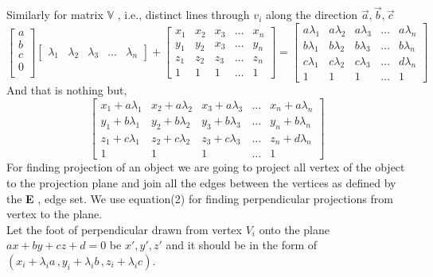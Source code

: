 	Similarly for matrix $ \mathbb{V} $ , i.e., distinct lines through $v_i$ along the direction $ \vec{a}, \vec{b}, \vec{c}$ \:
    $$ 
    \begin{bmatrix}
    a \\
    b \\
    c \\
    0 \\
    \end{bmatrix}
    \begin{bmatrix}
    \lambda_{1} & \lambda_{2} & \lambda_{3} & \dots  &\lambda_{n}
    \end{bmatrix}
    + 
    \begin{bmatrix}
    x_{1}       & x_{2} & x_{3} & \dots & x_{n} \\
    y_{1}       & y_{2} & x_{3} & \dots & y_{n} \\
    z_{1}       & z_{2} & z_{3} & \dots & z_{n} \\
    1 & 1 & 1& \dots & 1 
\end{bmatrix}
 = 
 \begin{bmatrix}
 a\lambda_{1} & a\lambda_{2} & a\lambda_{3} & \dots & a\lambda_{n} \\
 b\lambda_{1} & b\lambda_{2} & b\lambda_{3} & \dots &b\lambda_{n} \\
 c\lambda_{1} & c\lambda_{2} & c\lambda_{3} & \dots & d\lambda_{n} \\
1 & 1 & 1& \dots & 1 
 \end{bmatrix}
 $$
 And that is nothing but,
 $$
 \begin{bmatrix}
 x_1 + a\lambda_{1} & x_2 + a\lambda_{2} & x_3 + a\lambda_{3} & \dots& x_n + a\lambda_{n} \\
 y_1 + b\lambda_{1} & y_2 + b\lambda_{2} & y_3 + b\lambda_{3} & \dots& y_n + b\lambda_{n} \\
 z_1 + c\lambda_{1} & z_2 + c\lambda_{2} & z_3 + c\lambda_{3} & \dots& z_n + d\lambda_{n} \\
 1 & 1 & 1& \dots & 1 
 \end{bmatrix}
$$
For finding projection of an object we are going to project all vertex of the object to the projection plane and join all the edges between the vertices as defined by the \textbf{E} , edge set. We use  equation(2) for finding perpendicular projections from vertex to the plane.\\
Let the foot of perpendicular drawn from vertex \(V_i\) onto the plane \(ax+by+cz+d=0\) be \(x\prime ,y\prime ,z\prime \) and it should be in the form of \((x_i+\lambda_{i} a\,,y_i+\lambda_{i} b\,,z_i+\lambda_{i}c)\).
